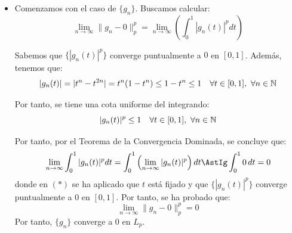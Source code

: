 \begin{ejercicio}
\begin{enumerate}
\begin{description}
\begin{itemize}
            Puesto que la raíz $p$-ésima es continua, se concluye que:
            \begin{equation*}
                \lim_{n \to \infty} \|f_n - 0\|_p = 0
            \end{equation*}
            Por tanto, $\{f_n\}$ converge a $0$ en $L_p$.
            \item Comenzamos con el caso de $\{g_n\}$. Buscamos calcular:
            \begin{equation*}
                \lim_{n \to \infty} \|g_n - 0\|_p^p = \lim_{n \to \infty} \left(\int_0^1 |g_n(t)|^p dt\right)
            \end{equation*}

            Sabemos que $\{|g_n(t)|^p\}$ converge puntualmente a $0$ en $[0, 1]$. Además, tenemos que:
            \begin{equation*}
                |g_n(t)| = |t^n - t^{2n}| = t^n (1 - t^n) \leq 1 - t^n \leq 1 \quad \forall t \in [0, 1],\ \forall n \in \bb{N}
            \end{equation*}

            Por tanto, se tiene una cota uniforme del integrando:
            \begin{equation*}
                |g_n(t)|^p \leq 1 \quad \forall t \in [0, 1],\ \forall n \in \bb{N}
            \end{equation*}

            Por tanto, por el Teorema de la Convergencia Dominada, se concluye que:
            \begin{equation*}
                \lim_{n \to \infty} \int_0^1 |g_n(t)|^p dt = \int_0^1 \left(\lim_{n \to \infty} |g_n(t)|^p\right) dt \AstIg \int_0^1 0\, dt = 0
            \end{equation*}
            donde en $(\ast)$ se ha aplicado que $t$ está fijado y que $\{|g_n(t)|^p\}$ converge puntualmente a $0$ en $[0, 1]$. Por tanto, se ha probado que:
            \begin{equation*}
                \lim_{n \to \infty} \|g_n - 0\|_p^p = 0
            \end{equation*}
            Por tanto, $\{g_n\}$ converge a $0$ en $L_p$.
        \end{itemize}
    \end{description}
\end{enumerate}


\end{ejercicio}
